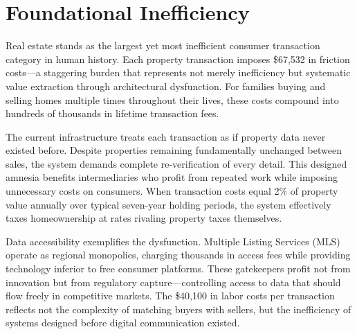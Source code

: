 \section{Foundational Inefficiency}

Real estate stands as the largest yet most inefficient consumer transaction category in human history. Each property transaction imposes \$67{,}532 in friction costs—a staggering burden that represents not merely inefficiency but systematic value extraction through architectural dysfunction. For families buying and selling homes multiple times throughout their lives, these costs compound into hundreds of thousands in lifetime transaction fees.

The current infrastructure treats each transaction as if property data never existed before. Despite properties remaining fundamentally unchanged between sales, the system demands complete re-verification of every detail. This designed amnesia benefits intermediaries who profit from repeated work while imposing unnecessary costs on consumers. When transaction costs equal 2\% of property value annually over typical seven-year holding periods, the system effectively taxes homeownership at rates rivaling property taxes themselves.

Data accessibility exemplifies the dysfunction. Multiple Listing Services (MLS) operate as regional monopolies, charging thousands in access fees while providing technology inferior to free consumer platforms. These gatekeepers profit not from innovation but from regulatory capture—controlling access to data that should flow freely in competitive markets. The \$40{,}100 in labor costs per transaction reflects not the complexity of matching buyers with sellers, but the inefficiency of systems designed before digital communication existed.

